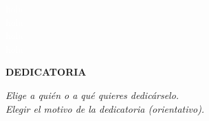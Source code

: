 \textcolor{white}{
hola \\
hola \\
hola \\
hola \\
}
\begin{flushright}
\LARGE{\textbf{DEDICATORIA}}
\end{flushright}


\begin{flushright}
\textit{Elige a quién o a qué quieres dedicárselo. \\
Elegir el motivo de la dedicatoria (orientativo).}
\end{flushright}